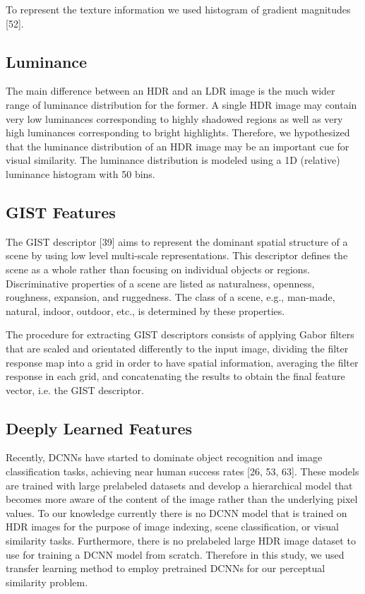 To represent the texture information we used histogram of gradient magnitudes [52].
\subsection{Luminance}
The main difference between an HDR and an LDR image is the much wider range of luminance distribution for the former. A single HDR image may contain very low luminances corresponding to highly shadowed regions as well as very high luminances corresponding to bright highlights. Therefore, we hypothesized that the luminance distribution of an HDR image may be an important cue for visual similarity. The luminance distribution is modeled using a 1D (relative) luminance histogram with 50 bins.
\subsection{GIST Features}
The GIST descriptor [39] aims to represent the dominant spatial structure of a scene by using low level multi-scale representations. This descriptor defines the scene as a whole rather than focusing on individual objects or regions. Discriminative properties of a scene are listed as naturalness, openness, roughness, expansion, and ruggedness. The class of a scene, e.g., man-made, natural, indoor, outdoor, etc., is determined by these properties.

The procedure for extracting GIST descriptors consists of applying Gabor filters that are scaled and orientated differently to the input image, dividing the filter response map into a grid in order to have spatial information, averaging the filter response in each grid, and concatenating the results to obtain the final feature vector, i.e. the GIST descriptor.
\subsection{Deeply Learned Features}
Recently, DCNNs have started to dominate object recognition and image classification tasks, achieving near human success rates [26, 53, 63]. These models are trained with large prelabeled datasets and develop a hierarchical model that becomes more aware of the content of the image rather than the underlying pixel values.
To our knowledge currently there is no DCNN model that is trained on HDR images for the purpose of image indexing, scene classification, or visual similarity tasks. Furthermore, there is no prelabeled large HDR image dataset to use for training a DCNN model from scratch. Therefore in this study, we used transfer learning method to employ pretrained DCNNs for our perceptual similarity problem.

